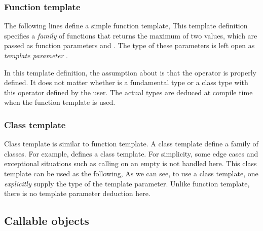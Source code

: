 \subsubsection{Function template}
\label{ssub:Function template}

The following lines define a simple function template,
This template definition specifies a \emph{family} of functions that returns
the maximum of two values, which are passed as function parameters
 and . The type of these parameters is left open as
\emph{template parameter} .

In this template definition, the assumption about  is that the
operator \cppinline{<} is properly defined. It does not matter whether
 is a fundamental type or a class type with this operator defined
by the user. The actual types are deduced at compile time when the function
template is used.

\subsubsection{Class template}
\label{ssub:Class template}


Class template is similar to function template. A class template define a
family of classes. For example,
defines a  class template. For simplicity, some edge cases
and exceptional situations such as calling  on an empty
 is not handled here. This class template can be used as the
following,
As we can see, to use a class template, one \emph{explicitly} supply the type
of the template parameter. Unlike function template, there is no template
parameter deduction here.

\subsection{Callable objects}
\label{sub:Callable objects}


